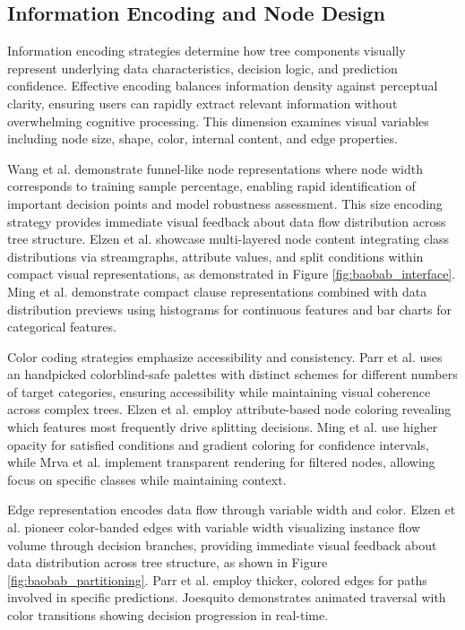 \subsection{Information Encoding and Node Design}

Information encoding strategies determine how tree components visually represent underlying data characteristics, decision logic, and prediction confidence. Effective encoding balances information density against perceptual clarity, ensuring users can rapidly extract relevant information without overwhelming cognitive processing. This dimension examines visual variables including node size, shape, color, internal content, and edge properties.

Wang et al. \cite{wang2022timbertrek} demonstrate funnel-like node representations where node width corresponds to training sample percentage, enabling rapid identification of important decision points and model robustness assessment. This size encoding strategy provides immediate visual feedback about data flow distribution across tree structure. Elzen et al. \cite{elzen2011baobabview} showcase multi-layered node content integrating class distributions via streamgraphs, attribute values, and split conditions within compact visual representations, as demonstrated in Figure \ref{fig:baobab_interface}. Ming et al. \cite{ming2019rulematrix} demonstrate compact clause representations combined with data distribution previews using histograms for continuous features and bar charts for categorical features.

Color coding strategies emphasize accessibility and consistency. Parr et al. \cite{parr2019dtreeviz} uses an handpicked colorblind-safe palettes with distinct schemes for different numbers of target categories, ensuring accessibility while maintaining visual coherence across complex trees. Elzen et al. \cite{elzen2011baobabview} employ attribute-based node coloring revealing which features most frequently drive splitting decisions. Ming et al. \cite{ming2019rulematrix} use higher opacity for satisfied conditions and gradient coloring for confidence intervals, while Mrva et al. \cite{mrva2019decision} implement transparent rendering for filtered nodes, allowing focus on specific classes while maintaining context.

Edge representation encodes data flow through variable width and color. Elzen et al. \cite{elzen2011baobabview} pioneer color-banded edges with variable width visualizing instance flow volume through decision branches, providing immediate visual feedback about data distribution across tree structure, as shown in Figure \ref{fig:baobab_partitioning}. Parr et al. \cite{parr2019dtreeviz} employ thicker, colored edges for paths involved in specific predictions. Joesquito \cite{joesquito2024decision} demonstrates animated traversal with color transitions showing decision progression in real-time.

